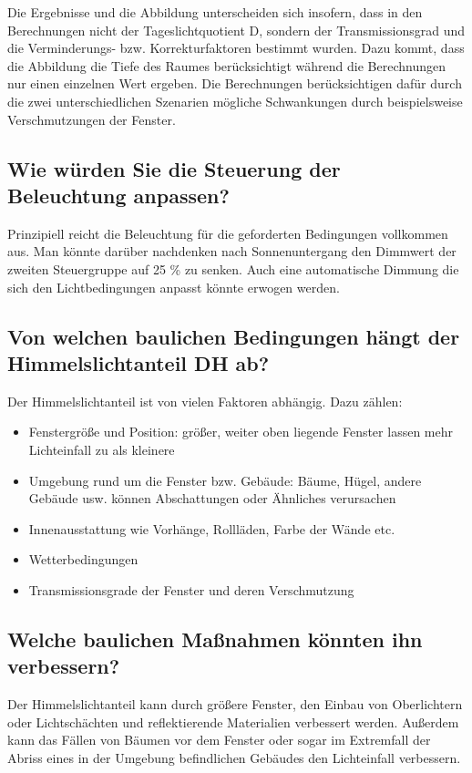 Die Ergebnisse und die Abbildung unterscheiden sich insofern, dass in den Berechnungen nicht der Tageslichtquotient D, sondern der Transmissionsgrad und die Verminderungs- bzw. Korrekturfaktoren bestimmt wurden.
Dazu kommt, dass die Abbildung die Tiefe des Raumes berücksichtigt während die Berechnungen nur einen einzelnen Wert ergeben. 
Die Berechnungen berücksichtigen dafür durch die zwei unterschiedlichen Szenarien mögliche Schwankungen durch beispielsweise Verschmutzungen der Fenster.

\subsection{Wie würden Sie die Steuerung der Beleuchtung anpassen?}

Prinzipiell reicht die Beleuchtung für die geforderten Bedingungen vollkommen aus.
Man könnte darüber nachdenken nach Sonnenuntergang den Dimmwert der zweiten Steuergruppe auf 25 \% zu senken. Auch eine automatische Dimmung die sich den Lichtbedingungen anpasst könnte erwogen werden.



\subsection{Von welchen baulichen Bedingungen hängt der Himmelslichtanteil DH ab?}

Der Himmelslichtanteil ist von vielen Faktoren abhängig. Dazu zählen:
\begin{itemize}
\item Fenstergröße und Position: größer, weiter oben liegende Fenster lassen mehr Lichteinfall zu als kleinere
\item Umgebung rund um die Fenster bzw. Gebäude: Bäume, Hügel, andere Gebäude usw. können Abschattungen oder Ähnliches verursachen
\item Innenausstattung wie Vorhänge, Rollläden, Farbe der Wände etc. 
\item Wetterbedingungen
\item Transmissionsgrade der Fenster und deren Verschmutzung

\end{itemize}

\subsection{Welche baulichen Maßnahmen könnten ihn verbessern?}
Der Himmelslichtanteil kann durch größere Fenster, den Einbau von Oberlichtern oder Lichtschächten und reflektierende Materialien verbessert werden. Außerdem kann das Fällen von Bäumen vor dem Fenster oder sogar im Extremfall der Abriss eines in der Umgebung befindlichen Gebäudes den Lichteinfall verbessern.

